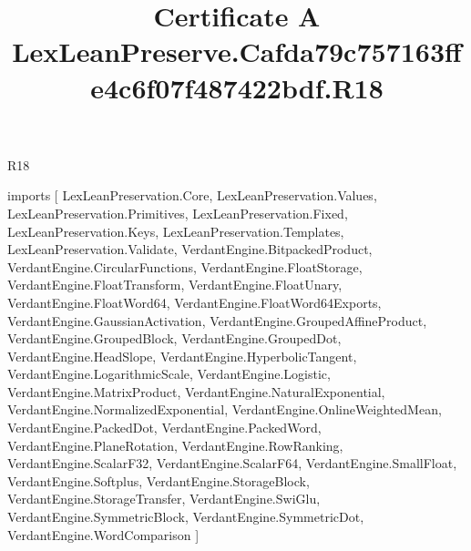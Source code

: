 \begin{lexlean}{R18}
\title{Certificate A LexLeanPreserve.Cafda79c757163ffe4c6f07f487422bdf.R18}
\begin{coremodule}
imports [
  LexLeanPreservation.Core,
  LexLeanPreservation.Values,
  LexLeanPreservation.Primitives,
  LexLeanPreservation.Fixed,
  LexLeanPreservation.Keys,
  LexLeanPreservation.Templates,
  LexLeanPreservation.Validate,
  VerdantEngine.BitpackedProduct,
  VerdantEngine.CircularFunctions,
  VerdantEngine.FloatStorage,
  VerdantEngine.FloatTransform,
  VerdantEngine.FloatUnary,
  VerdantEngine.FloatWord64,
  VerdantEngine.FloatWord64Exports,
  VerdantEngine.GaussianActivation,
  VerdantEngine.GroupedAffineProduct,
  VerdantEngine.GroupedBlock,
  VerdantEngine.GroupedDot,
  VerdantEngine.HeadSlope,
  VerdantEngine.HyperbolicTangent,
  VerdantEngine.LogarithmicScale,
  VerdantEngine.Logistic,
  VerdantEngine.MatrixProduct,
  VerdantEngine.NaturalExponential,
  VerdantEngine.NormalizedExponential,
  VerdantEngine.OnlineWeightedMean,
  VerdantEngine.PackedDot,
  VerdantEngine.PackedWord,
  VerdantEngine.PlaneRotation,
  VerdantEngine.RowRanking,
  VerdantEngine.ScalarF32,
  VerdantEngine.ScalarF64,
  VerdantEngine.SmallFloat,
  VerdantEngine.Softplus,
  VerdantEngine.StorageBlock,
  VerdantEngine.StorageTransfer,
  VerdantEngine.SwiGlu,
  VerdantEngine.SymmetricBlock,
  VerdantEngine.SymmetricDot,
  VerdantEngine.WordComparison
]


\end{coremodule}
\end{lexlean}
